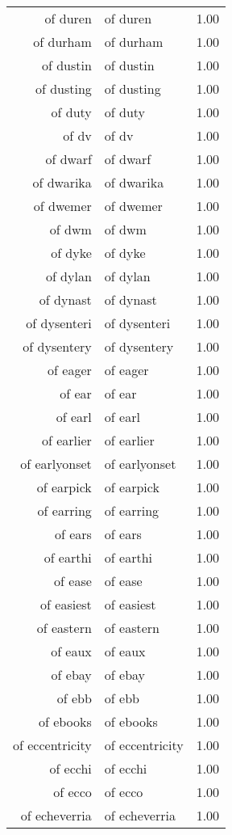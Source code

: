 \begin{table}[ht]
\begin{tabular}{rlr}
  of duren & of duren & 1.00 \\ 
  of durham & of durham & 1.00 \\ 
  of dustin & of dustin & 1.00 \\ 
  of dusting & of dusting & 1.00 \\ 
  of duty & of duty & 1.00 \\ 
  of dv & of dv & 1.00 \\ 
  of dwarf & of dwarf & 1.00 \\ 
  of dwarika & of dwarika & 1.00 \\ 
  of dwemer & of dwemer & 1.00 \\ 
  of dwm & of dwm & 1.00 \\ 
  of dyke & of dyke & 1.00 \\ 
  of dylan & of dylan & 1.00 \\ 
  of dynast & of dynast & 1.00 \\ 
  of dysenteri & of dysenteri & 1.00 \\ 
  of dysentery & of dysentery & 1.00 \\ 
  of eager & of eager & 1.00 \\ 
  of ear & of ear & 1.00 \\ 
  of earl & of earl & 1.00 \\ 
  of earlier & of earlier & 1.00 \\ 
  of earlyonset & of earlyonset & 1.00 \\ 
  of earpick & of earpick & 1.00 \\ 
  of earring & of earring & 1.00 \\ 
  of ears & of ears & 1.00 \\ 
  of earthi & of earthi & 1.00 \\ 
  of ease & of ease & 1.00 \\ 
  of easiest & of easiest & 1.00 \\ 
  of eastern & of eastern & 1.00 \\ 
  of eaux & of eaux & 1.00 \\ 
  of ebay & of ebay & 1.00 \\ 
  of ebb & of ebb & 1.00 \\ 
  of ebooks & of ebooks & 1.00 \\ 
  of eccentricity & of eccentricity & 1.00 \\ 
  of ecchi & of ecchi & 1.00 \\ 
  of ecco & of ecco & 1.00 \\ 
  of echeverria & of echeverria & 1.00 \\ 

\end{tabular}
\end{table}
